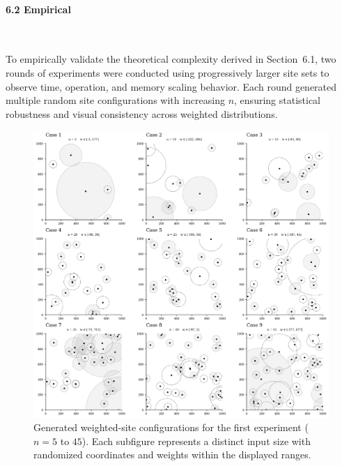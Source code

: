 \documentclass{article}
\begin{document}
\paragraph{6.2 Empirical}\

To empirically validate the theoretical complexity derived in Section~6.1, two rounds of experiments were conducted using progressively larger site sets to observe time, operation, and memory scaling behavior.  
Each round generated multiple random site configurations with increasing $n$, ensuring statistical robustness and visual consistency across weighted distributions.

\begin{figure}[H]
    \centering
    \includegraphics[width=0.95\linewidth]{Pictures/test_sites1.png}
    \caption{Generated weighted-site configurations for the first experiment ($n=5$ to $45$). 
    Each subfigure represents a distinct input size with randomized coordinates and weights within the displayed ranges.}
    \label{fig:test_sites1}
\end{figure}
\end{document}
